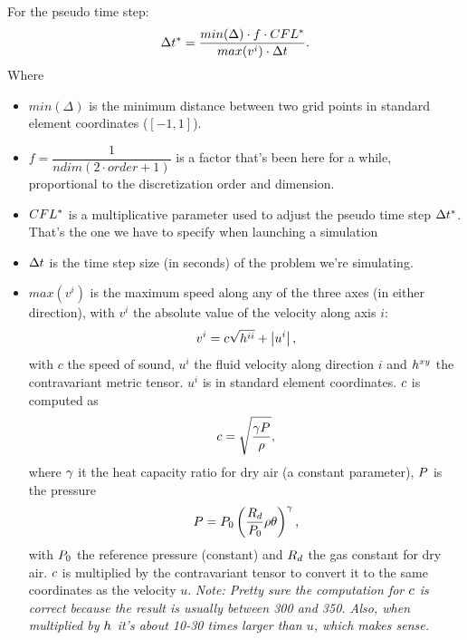 \documentclass{article}
\begin{document}
For the pseudo time step:
\begin{equation}
    \Delta t^* = \dfrac{min(\Delta) \cdot f \cdot CFL^*}{max(v^i) \cdot \Delta t}
    \text{.}
\end{equation}
Where
\begin{itemize}
\item $min(\Delta)$ is the minimum distance between two grid points in 
    standard element coordinates ($[-1, 1]$).
\item $f = \dfrac{1}{ndim \left(2\cdot order + 1\right)}$ is a factor that's been here for a while,
    proportional to the discretization order and dimension.
\item $CFL^*$ is a multiplicative parameter used to adjust the pseudo time step $\Delta t^*$.
    That's the one we have to specify when launching a simulation
\item $\Delta t$ is the time step size (in seconds) of the problem we're simulating.
\item $max(v^i)$ is the maximum speed along any of the three axes (in either direction),
    with $v^i$ the absolute value of the velocity along axis $i$:
    \begin{equation}
        v^i = c \sqrt{h^{{i}{i}}} + \left|u^i\right|
        \text{,}
    \end{equation}
    with $c$ the speed of sound, $u^i$ the fluid velocity along direction $i$ and $h^{{x}{y}}$
    the contravariant metric tensor. $u^i$ is in standard element coordinates.
    $c$ is computed as
    \begin{equation}
        c = \sqrt{\dfrac{\gamma P}{\rho}}
        \text{,}
    \end{equation}
    where $\gamma$ it the heat capacity ratio for dry air (a constant parameter),
    $P$ is the pressure
    \begin{equation}
        P = P_0 \left(\dfrac{R_d}{P_0}\rho\theta\right)^\gamma
        \text{,}
    \end{equation}
    with $P_0$ the reference pressure (constant) and $R_d$ the gas constant for dry air.
    $c$ is multiplied by the contravariant tensor to convert it to the same coordinates
    as the velocity $u$.
    \emph{Note: Pretty sure the computation for $c$ is correct because the result is usually
    between 300 and 350.
    Also, when multiplied by $h^{{}{}}$ it's about 10-30 times larger than $u$, which makes sense.}
\end{itemize}
\end{document}
